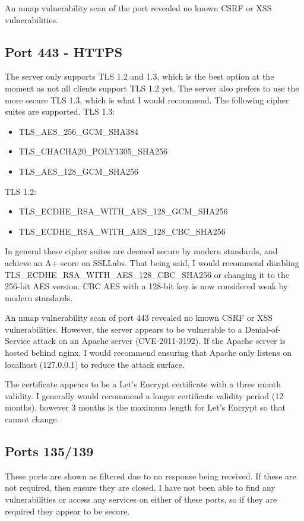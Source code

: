 \documentclass[12pt]{article}
\begin{document}
  An nmap vulnerability scan of the port revealed no known CSRF or XSS vulnerabilities.

  \subsection{Port 443 - HTTPS}
  The server only supports TLS 1.2 and 1.3, which is the best option at the moment as not all clients support TLS 1.2 yet.
  The server also prefers to use the more secure TLS 1.3, which is what I would recommend.
  The following cipher suites are supported.
  TLS 1.3:
  \begin{itemize}
    \item TLS\_AES\_256\_GCM\_SHA384
    \item TLS\_CHACHA20\_POLY1305\_SHA256
    \item TLS\_AES\_128\_GCM\_SHA256
  \end{itemize}
  TLS 1.2:
  \begin{itemize}
    \item TLS\_ECDHE\_RSA\_WITH\_AES\_128\_GCM\_SHA256
    \item TLS\_ECDHE\_RSA\_WITH\_AES\_128\_CBC\_SHA256
  \end{itemize}

  In general these cipher suites are deemed secure by modern standards, and achieve an A+ score on SSLLabs.
  That being said, I would recommend disabling TLS\_ECDHE\_RSA\_WITH\_AES\_128\_CBC\_SHA256 or changing it to the 256-bit AES version.
  CBC AES with a 128-bit key is now considered weak by modern standards.

  An nmap vulnerability scan of port 443 revealed no known CSRF or XSS vulnerabilities.
  However, the server appears to be vulnerable to a Denial-of-Service attack on an Apache server (CVE-2011-3192).
  If the Apache server is hosted behind nginx, I would recommend ensuring that Apache only listens on localhost (127.0.0.1) to reduce the attack surface.

  The certificate appears to be a Let's Encrypt certificate with a three month validity.
  I generally would recommend a longer certificate validity period (12 months), however 3 months is the maximum length for Let's Encrypt so that cannot change.

  \subsection{Ports 135/139}
  These ports are shown as filtered due to no response being received.
  If these are not required, then ensure they are closed.
  I have not been able to find any vulnerabilities or access any services on either of these ports, so if they are required they appear to be secure.
\end{document}
